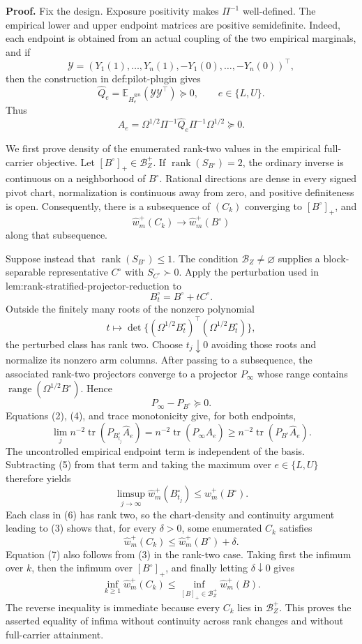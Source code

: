 \textbf{Proof.}
Fix the design.  Exposure positivity makes \(\Pi^{-1}\) well-defined.  The empirical lower and upper endpoint matrices are positive semidefinite.  Indeed, each endpoint is obtained from an actual coupling of the two empirical marginals, and if
\[
 \mathcal Y=(Y_1(1),\ldots,Y_n(1),-Y_1(0),\ldots,-Y_n(0))^{\top},
\]
then the construction in def:pilot-plugin gives
\[
 \widehat Q_e=\mathbb E_{\widehat H_e^{\otimes n}}
 (\mathcal Y\mathcal Y^{\top})\succeq0,
 \qquad e\in\{L,U\}.
\tag{1}
\]
Thus
\[
 \widehat A_e=
 \Omega^{1/2}\Pi^{-1}\widehat Q_e\Pi^{-1}\Omega^{1/2}
 \succeq0.
\tag{2}
\]

We first prove density of the enumerated rank-two values in the empirical full-carrier objective.  Let \([B^{\circ}]_+\in\mathcal B_Z^+\).  If \(\operatorname{rank}(S_{B^{\circ}})=2\), the ordinary inverse is continuous on a neighborhood of \(B^{\circ}\).  Rational directions are dense in every signed pivot chart, normalization is continuous away from zero, and positive definiteness is open.  Consequently, there is a subsequence of \((C_k)\) converging to \([B^{\circ}]_+\), and
\[
 \widehat w_m^+(C_k)\longrightarrow
 \widehat w_m^+(B^{\circ})
\tag{3}
\]
along that subsequence.

Suppose instead that \(\operatorname{rank}(S_{B^{\circ}})\le1\).  The condition \(\mathcal B_Z\ne\varnothing\) supplies a block-separable representative \(C^{\circ}\) with \(S_{C^{\circ}}\succ0\).  Apply the perturbation used in lem:rank-stratified-projector-reduction to
\[
 B_t^{\circ}=B^{\circ}+tC^{\circ}.
\]
Outside the finitely many roots of the nonzero polynomial
\[
 t\longmapsto
 \det\{(\Omega^{1/2}B_t^{\circ})^{\top}
          (\Omega^{1/2}B_t^{\circ})\},
\]
the perturbed class has rank two.  Choose \(t_j\downarrow0\) avoiding those roots and normalize its nonzero arm columns.  After passing to a subsequence, the associated rank-two projectors converge to a projector \(P_{\infty}\) whose range contains
\(\operatorname{range}(\Omega^{1/2}B^{\circ})\).  Hence
\[
 P_{\infty}-P_{B^{\circ}}\succeq0.
\tag{4}
\]
Equations (2), (4), and trace monotonicity give, for both endpoints,
\[
 \lim_j n^{-2}\operatorname{tr}(P_{B_{t_j}^{\circ}}\widehat A_e)
 =n^{-2}\operatorname{tr}(P_{\infty}\widehat A_e)
 \ge n^{-2}\operatorname{tr}(P_{B^{\circ}}\widehat A_e).
\tag{5}
\]
The uncontrolled empirical endpoint term is independent of the basis.  Subtracting (5) from that term and taking the maximum over \(e\in\{L,U\}\) therefore yields
\[
 \limsup_{j\to\infty}
 \widehat w_m^+(B_{t_j}^{\circ})
 \le \widehat w_m^+(B^{\circ}).
\tag{6}
\]
Each class in (6) has rank two, so the chart-density and continuity argument leading to (3) shows that, for every \(\delta>0\), some enumerated \(C_k\) satisfies
\[
 \widehat w_m^+(C_k)
 \le \widehat w_m^+(B^{\circ})+\delta.
\tag{7}
\]
Equation (7) also follows from (3) in the rank-two case.  Taking first the infimum over \(k\), then the infimum over \([B^{\circ}]_+\), and finally letting \(\delta\downarrow0\) gives
\[
 \inf_{k\ge1}\widehat w_m^+(C_k)
 \le\inf_{[B]_+\in\mathcal B_Z^+}\widehat w_m^+(B).
\tag{8}
\]
The reverse inequality is immediate because every \(C_k\) lies in \(\mathcal B_Z^+\).  This proves the asserted equality of infima without continuity across rank changes and without full-carrier attainment.

